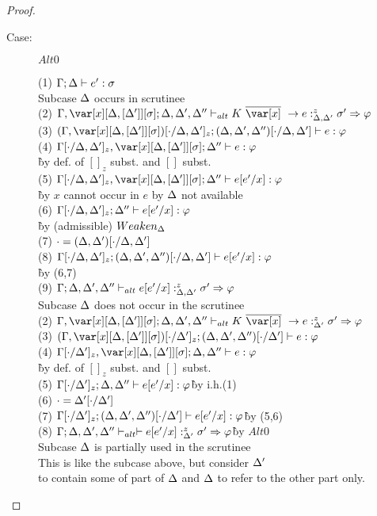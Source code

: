 \begin{proof}
\begin{description}
\item[Case:] $Alt0$
\begin{tabbing}
    (1) $\Gamma; \Delta \vdash e' : \sigma$\\
    Subcase $\Delta$ occurs in scrutinee\\
    (2) $\G,\xD; \D,\D',\D'' \vdash_{alt} K~\ov{\x}~\to e :^z_{\D,\D'} \s' \Rightarrow \vp$\\
    (3) $(\G,\xD)[\cdot/\D,\D']_z; (\D,\D',\D'')[\cdot/\D,\D'] \vdash e : \vp$\\
    (4) $\G[\cdot/\D,\D']_z, \xD; \D'' \vdash e : \vp$\\\`by def. of $[]_z$ subst. and $[]$ subst.\\
    (5) $\G[\cdot/\D,\D']_z, \xD; \D'' \vdash e[e'/x] : \vp$\\\`by $x$ cannot occur in $e$ by $\Delta$ not available\\
    (6) $\Gamma[\cdot/\Delta,\Delta']_z; \Delta'' \vdash e[e'/x] : \varphi$\\\`by (admissible) $Weaken_\Delta$\\
    (7) $\cdot = (\Delta,\Delta')[\cdot/\Delta,\Delta']$\\
    (8) $\Gamma[\cdot/\Delta,\Delta']_z; (\Delta,\Delta',\Delta'')[\cdot/\Delta,\Delta'] \vdash e[e'/x] : \varphi$\\\`by (6,7)\\
    (9) $\Gamma;\Delta,\Delta',\Delta'' \vdash_{alt} e[e'/x] :^z_{\Delta,\Delta'} \sigma' \Rightarrow \varphi$\\
    Subcase $\Delta$ does not occur in the scrutinee\\
    (2) $\G,\xD; \D,\D',\D'' \vdash_{alt} K~\ov{\x}~\to e :^z_{\D'} \s' \Rightarrow \vp$\\
    (3) $(\G,\xD)[\cdot/\D']_z; (\D,\D',\D'')[\cdot/\D'] \vdash e : \vp$\\
    (4) $\G[\cdot/\D']_z, \xD; \D,\D'' \vdash e : \vp$\\\`by def. of $[]_z$ subst. and $[]$ subst.\\
    (5) $\Gamma[\cdot/\Delta']_z; \Delta,\Delta'' \vdash e[e'/x] : \varphi$\` by i.h.(1)\\
    (6) $\cdot = \Delta'[\cdot/\Delta']$\\
    (7) $\Gamma[\cdot/\Delta']_z; (\Delta,\Delta',\Delta'')[\cdot/\Delta'] \vdash e[e'/x] : \varphi$\` by (5,6)\\
    (8) $\Gamma;\Delta,\Delta',\Delta'' \vdash_{alt} \vdash e[e'/x] :^z_{\Delta'} \sigma' \Rightarrow \varphi$\`by $Alt0$\\
    Subcase $\Delta$ is partially used in the scrutinee\\
    This is like the subcase above, but consider $\Delta'$\\
    to contain some of part of $\Delta$ and $\Delta$ to refer to the other part only.
\end{tabbing}


\end{description}
\end{proof}
